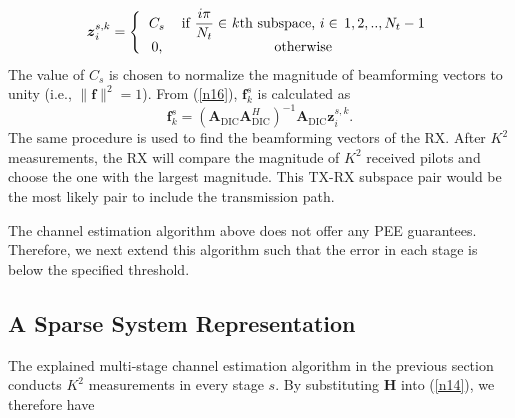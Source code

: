 \documentclass{ieeeaccess}
\begin{document}
\begin{equation} \label{alaki}
\boldsymbol{z}_i^{s,k} = \Bigg\{   \begin{tabular}{cc}
  $C_s$ & if $\dfrac{i\pi}{N_t} \in$ $k$th subspace, $i\in\, 1,2,..,N_t-1$ \\
  0, & otherwise
  \end{tabular}
\end{equation}
The value of $C_s$ is chosen to normalize the magnitude of beamforming vectors to unity (i.e., $\|\boldsymbol{f}\|^2 = 1$). From (\ref{n16}), $\boldsymbol{f}_k^{s}$ is calculated as
\begin{equation} \label{n18}
 \boldsymbol{f}_k^{s} = (\boldsymbol{A}_{\textrm{DIC}}\boldsymbol{A}_{\textrm{DIC}}^H)^{-1}\boldsymbol{A}_{\textrm{DIC}}\boldsymbol{z}_i^{s,k}.
\end{equation}
The same procedure is used to find the beamforming vectors of the RX. After $K^2$ measurements, the RX will compare the magnitude of $K^2$ received pilots and choose the one with the largest magnitude. This TX-RX subspace pair would be the most likely pair to include the transmission path.

The channel estimation algorithm above does not offer any PEE guarantees. Therefore, we next extend this algorithm such that the error in each stage is below the specified threshold.
\subsection{A Sparse System Representation}
The explained multi-stage channel estimation algorithm in the previous section conducts $K^2$ measurements in every stage $s$. By substituting $\boldsymbol{H}$ into (\ref{n14}), we therefore have
\end{document}
